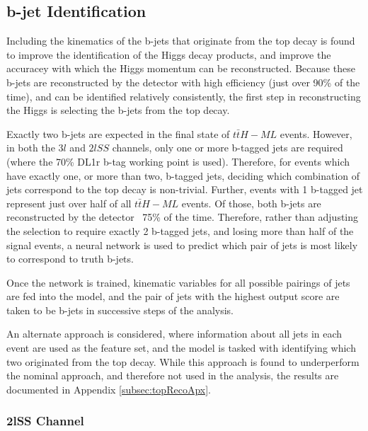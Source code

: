 \subsection{b-jet Identification}
\label{sec:bjetID}

Including the kinematics of the b-jets that originate from the top decay is found to improve the identification of the Higgs decay products, and improve the accuracey with which the Higgs momentum can be reconstructed. Because these b-jets are reconstructed by the detector with high efficiency (just over 90\% of the time), and can be identified relatively consistently, the first step in reconstructing the Higgs is selecting the b-jets from the top decay.

Exactly two b-jets are expected in the final state of $t\bar{t}H-ML$ events. However, in both the $3l$  and $2lSS$ channels, only one or more b-tagged jets are required (where the 70\% DL1r b-tag working point is used). Therefore, for events which have exactly one, or more than two, b-tagged jets, deciding which combination of jets correspond to the top decay is non-trivial. Further, events with 1 b-tagged jet represent just over half of all $t\bar{t}H-ML$ events. Of those, both b-jets are reconstructed by the detector ~75\% of the time. Therefore, rather than adjusting the selection to require exactly 2 b-tagged jets, and losing more than half of the signal events, a neural network is used to predict which pair of jets is most likely to correspond to truth b-jets.

Once the network is trained, kinematic variables for all possible pairings of jets are fed into the model, and the pair of jets with the highest output score are taken to be b-jets in successive steps of the analysis. 

An alternate approach is considered, where information about all jets in each event are used as the feature set, and the model is tasked with identifying which two originated from the top decay. While this approach is found to underperform the nominal approach, and therefore not used in the analysis, the results are documented in Appendix \ref{subsec:topRecoApx}.

\subsubsection{2lSS Channel}
\label{subsec:top2lSS}

